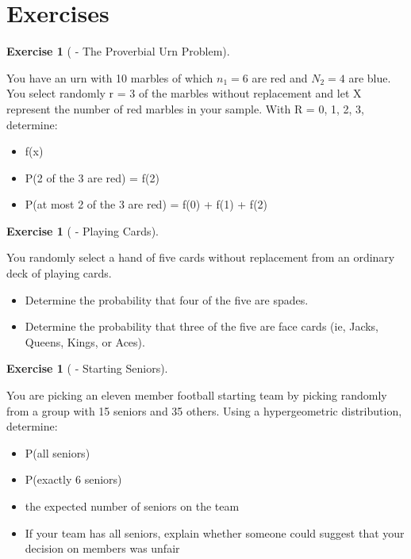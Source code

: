 \documentclass[10pt,]{book}
\theoremstyle{plain}
\theoremstyle{definition}
\theoremstyle{definition}
\theoremstyle{definition}
\newtheorem{exercise}[theorem]{Exercise}
\numberwithin{equation}{section}
\begin{document}
\section[{Exercises}]{Exercises}\label{section-33}
\begin{exercise}[{ - The Proverbial Urn Problem}]\label{exercise-31}

You have an urn with 10 marbles of which \(n_1 = 6\) are red and \(N_2 = 4\) are blue. You select randomly r = 3 of the marbles without replacement and let X represent the number of red marbles in your sample. With R = {0, 1, 2, 3}, determine:
\leavevmode%
\begin{itemize}[label=\textbullet]
\item{}f(x)%
\item{}P(2 of the 3 are red) = f(2)%
\item{}P(at most 2 of the 3 are red) = f(0) + f(1) + f(2)%
\end{itemize}
 
%
\end{exercise}
\begin{exercise}[{ - Playing Cards}]\label{exercise-32}

You randomly select a hand of five cards without replacement from an ordinary deck of playing cards.  
\leavevmode%
\begin{itemize}[label=\textbullet]
\item{}Determine the probability that four of the five are spades.%
\item{}Determine the probability that three of the five are face cards (ie, Jacks, Queens, Kings, or Aces).%
\end{itemize}

%
\end{exercise}
\begin{exercise}[{ - Starting Seniors}]\label{exercise-33}

You are picking an eleven member football starting team by picking randomly from a group with 15 seniors and 35 others.  Using a hypergeometric distribution, determine:
\leavevmode%
\begin{itemize}[label=\textbullet]
\item{}P(all seniors)%
\item{}P(exactly 6 seniors)%
\item{}the expected number of seniors on the team%
\item{}If your team has all seniors, explain whether someone could suggest that your decision on members was unfair%
\end{itemize}

%
\end{exercise}
\end{document}
